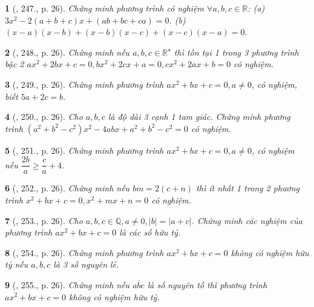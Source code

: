 \documentclass{article}
\newtheorem{baitoan}{}
\begin{document}
\begin{baitoan}[\cite{Binh_Toan_9_tap_2}, 247., p. 26]
	Chứng minh phương trình có nghiệm $\forall a,b,c\in\mathbb{R}$: (a) $3x^2 - 2(a + b + c)x + (ab + bc + ca) = 0$. (b) $(x - a)(x - b) + (x - b)(x - c) + (x - c)(x - a) = 0$.
\end{baitoan}

\begin{baitoan}[\cite{Binh_Toan_9_tap_2}, 248., p. 26]
	Chứng minh nếu $a,b,c\in\mathbb{R}^\star$ thì tồn tại 1 trong 3 phương trình bậc 2 $ax^2 + 2bx + c = 0,bx^2 + 2cx + a = 0,cx^2 + 2ax + b = 0$ có nghiệm.
\end{baitoan}

\begin{baitoan}[\cite{Binh_Toan_9_tap_2}, 249., p. 26]
	Chứng minh phương trình $ax^2 + bx + c = 0,a\ne0$, có nghiệm, biết $5a + 2c = b$.
\end{baitoan}

\begin{baitoan}[\cite{Binh_Toan_9_tap_2}, 250., p. 26]
	Cho $a,b,c$ là độ dài 3 cạnh 1 tam giác. Chứng minh phương trình $(a^2 + b^2 - c^2)x^2 - 4abx + a^2 + b^2 - c^2 = 0$ có nghiệm.
\end{baitoan}

\begin{baitoan}[\cite{Binh_Toan_9_tap_2}, 251., p. 26]
	Chứng minh phương trình $ax^2 + bx + c = 0,a\ne0$, có nghiệm nếu $\dfrac{2b}{a}\ge\dfrac{c}{a} + 4$.
\end{baitoan}

\begin{baitoan}[\cite{Binh_Toan_9_tap_2}, 252., p. 26]
	Chứng minh nếu $bm = 2(c + n)$ thì ít nhất 1 trong 2 phương trình $x^2 + bx + c = 0,x^2 + mx + n = 0$ có nghiệm.
\end{baitoan}

\begin{baitoan}[\cite{Binh_Toan_9_tap_2}, 253., p. 26]
	Cho $a,b,c\in\mathbb{Q},a\ne0,|b| = |a + c|$. Chứng minh các nghiệm của phương trình $ax^2 + bx + c = 0$ là các số hữu tỷ.
\end{baitoan}

\begin{baitoan}[\cite{Binh_Toan_9_tap_2}, 254., p. 26]
	Chứng minh phương trình $ax^2 + bx + c = 0$ không có nghiệm hữu tỷ nếu $a,b,c$ là 3 số nguyên lẻ.
\end{baitoan}

\begin{baitoan}[\cite{Binh_Toan_9_tap_2}, 255., p. 26]
	Chứng minh nếu $\overline{abc}$ là số nguyên tố thì phương trình $ax^2 + bx + c = 0$ không có nghiệm hữu tỷ.
\end{baitoan}
\end{document}
